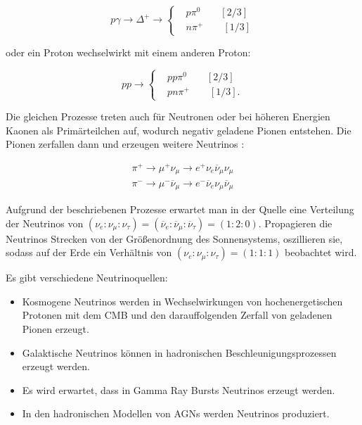 \begin{equation*}
p\gamma \rightarrow \Delta^+ \rightarrow	
\left\{
\begin{aligned}
& p \pi^0 \qquad [2/3] \\
& n \pi^+ \qquad [1/3]
\end{aligned}
\right.
\end{equation*}

oder ein Proton wechselwirkt mit einem anderen Proton\cite{DissBecker}:

\begin{equation*}
p p \rightarrow
\left\{
\begin{aligned}
& p p \pi^0 \qquad [2/3] \\
& p n \pi^+ \qquad [1/3].
\end{aligned}
\right.
\end{equation*}

Die gleichen Prozesse treten auch für Neutronen oder bei höheren Energien Kaonen als Primärteilchen auf, wodurch negativ geladene Pionen entstehen.
Die Pionen zerfallen dann und erzeugen weitere Neutrinos \cite{DissBecker}:

\begin{equation*}
 \begin{aligned}
 \pi^+ \rightarrow \mu^+ \nu_{\mu} \rightarrow e^+ \nu_e \overline{\nu}_{\mu} \nu_{\mu} \\ 
 \pi^- \rightarrow \mu^- \overline{\nu}_{\mu} \rightarrow e^- \overline{\nu}_e \nu_{\mu} \overline{\nu}_{\mu}
 \end{aligned}
\end{equation*}

Aufgrund der beschriebenen Prozesse erwartet man in der Quelle eine Verteilung der Neutrinos von $(\nu_e:\nu_{\mu}:\nu_{\tau})=(\overline{\nu}_e:\overline{\nu}_{\mu}:\overline{\nu}_{\tau})=(1:2:0)$.
Propagieren die Neutrinos Strecken von der Größenordnung des Sonnensystems, oszillieren sie, sodass auf der Erde ein Verhältnis von $(\nu_e:\nu_{\mu}:\nu_{\tau})=(1:1:1)$ beobachtet wird.

Es gibt verschiedene Neutrinoquellen:
\begin{itemize}
 \item Kosmogene Neutrinos werden in Wechselwirkungen von hochenergetischen Protonen mit dem CMB und den darauffolgenden Zerfall von geladenen Pionen erzeugt.
 \item Galaktische Neutrinos können in hadronischen Beschleunigungsprozessen erzeugt werden.
 \item Es wird erwartet, dass in Gamma Ray Bursts Neutrinos erzeugt werden.
 \item In den hadronischen Modellen von AGNs werden Neutrinos produziert. 
\end{itemize}


